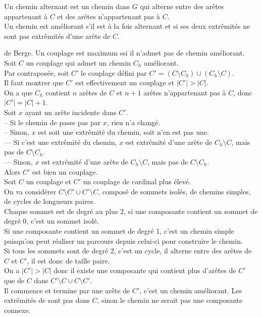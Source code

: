 \documentclass[french, 11pt]{article}
\begin{document}
\begin{defi}{}{}
    Un chemin alternant est un chemin dans $G$ qui alterne entre des arêtes appartenant à $C$ et des arêtes n'appartenant pas à $C$.\\
    Un chemin est améliorant s'il est à la fois alternant et si ses deux extrêmités ne sont pas extrêmités d'une arête de $C$.
\end{defi}

\begin{thm}{de Berge.}{}
    Un couplage est maximum ssi il n'admet pas de chemin améliorant.
    \tcblower
    Soit $C$ un couplage qui admet un chemin $C_h$ améliorant.\\
    \boxed{\ra} Par contraposée, soit $C'$ le couplage défini par $C'=(C\setminus C_h)\cup(C_h\setminus C)$.\\
    Il faut montrer que $C'$ est effectivement un couplage et $|C'|>|C|$.\\
    On a que $C_h$ contient $n$ arêtes de $C$ et $n+1$ arêtes n'appartenant pas à $C$, donc $|C'|=|C|+1$.\\
    Soit $x$ ayant un arête incidente dans $C'$.\\
    -- Si le chemin de passe pas par $x$, rien n'a changé.\\
    -- Sinon, $x$ est soit une extrêmité du chemin, soit n'en est pas une.\\
    --- Si c'est une extrêmité du chemin, $x$ est extrêmité d'une arête de $C_h\setminus C$, mais pas de $C\setminus C_h$.\\
    --- Sinon, $x$ est extrêmité d'une arête de $C_h\setminus C$, mais pas de $C\setminus C_h$.\\
    Alors $C'$ est bien un couplage.\\
    \boxed{\la} Soit $C$ un couplage et $C'$ un couplage de cardinal plus élevé.\\
    On va considérer $C\setminus C' \cup C' \setminus C$, composé de sommets isolés, de chemins simples, de cycles de longueurs paires.\\
    Chaque sommet est de degré au plus 2, si une composante contient un sommet de degré 0, c'est un sommet isolé.\\
    Si une composante contient un sommet de degré 1, c'est un chemin simple puisqu'on peut réaliser un parcours depuis celui-ci pour construire le chemin.\\
    Si tous les sommets sont de degré 2, c'est un cycle, il alterne entre des arêtes de $C$ et $C'$, il est donc de taille paire.\\
    On a $|C'|>|C|$ donc il existe une composante qui contient plus d'arêtes de $C'$ que de $C$ dans $C'\setminus C \cup C\setminus C'$.\\
    Il commence et termine par une arête de $C'$, c'est un chemin améliorant. Les extrêmités de sont pas dans $C$, sinon le chemin ne serait pas une composante connexe.
\end{thm}
\end{document}
